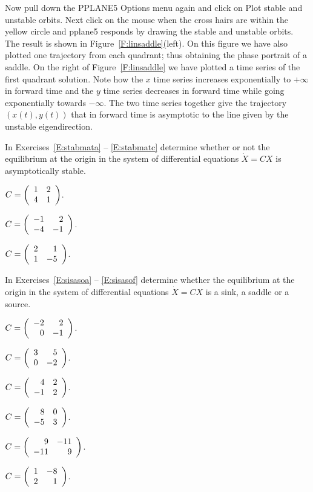 \documentclass{ximera}
\begin{document}
Now pull down the {\sf PPLANE5 Options} menu again and click on
{\sf Plot stable and unstable orbits}.  Next click on the mouse
when the cross hairs are within the yellow circle and {\sf
pplane5} responds by drawing the stable and unstable orbits.
The result is shown in Figure~\ref{F:linsaddle}(left).
On this figure we have also plotted one trajectory
from each quadrant; thus obtaining the phase portrait of a saddle.
On the right of Figure~\ref{F:linsaddle} we have plotted a
time series of the first quadrant solution.  Note how the $x$
time series increases exponentially to $+\infty$ in forward time and 
the $y$ time series decreases in forward time while going exponentially 
towards $-\infty$.  The two time series together
give the trajectory $(x(t),y(t))$ that in forward time is asymptotic
to the line given by the unstable eigendirection.



\EXER

\TEXER


\noindent In Exercises~\ref{E:stabmata} -- \ref{E:stabmatc} determine
whether or not the equilibrium at the origin in the system of differential
equations $\dot{X}=CX$ is asymptotically stable.
\begin{exercise} \label{E:stabmata}
$C=\left(\begin{array}{rr} 1 & 2\\ 4 &1\end{array}\right)$.
\end{exercise}
\begin{exercise} \label{E:stabmatb}
$C=\left(\begin{array}{rr} -1 & 2\\ -4 &-1\end{array}\right)$.
\end{exercise}
\begin{exercise} \label{E:stabmatc}
$C=\left(\begin{array}{rr} 2 & 1\\ 1 &-5\end{array}\right)$.
\end{exercise}

\noindent In Exercises~\ref{E:sisasoa} -- \ref{E:sisasof} determine
whether the equilibrium at the origin in the system of differential
equations $\dot{X}=CX$ is a sink, a saddle or a source.
\begin{exercise} \label{E:sisasoa}
$C=\left(\begin{array}{rr} -2 & 2\\ 0 &-1\end{array}\right)$.
\end{exercise}
\begin{exercise} \label{E:sisasob}
$C=\left(\begin{array}{rr} 3 & 5\\ 0 &-2\end{array}\right)$.
\end{exercise}
\begin{exercise} \label{E:sisasoc}
$C=\left(\begin{array}{rr} 4 & 2\\ -1 &2\end{array}\right)$.
\end{exercise}
\begin{exercise} \label{E:sisasod}
$C=\left(\begin{array}{rr} 8 & 0\\ -5 &3\end{array}\right)$.
\end{exercise}
\begin{exercise} \label{E:sisasoe}
$C=\left(\begin{array}{rr} 9 & -11\\ -11 &9\end{array}\right)$.
\end{exercise}
\begin{exercise} \label{E:sisasof}
$C=\left(\begin{array}{rr} 1 & -8\\ 2 &1\end{array}\right)$.
\end{exercise}
\end{document}
